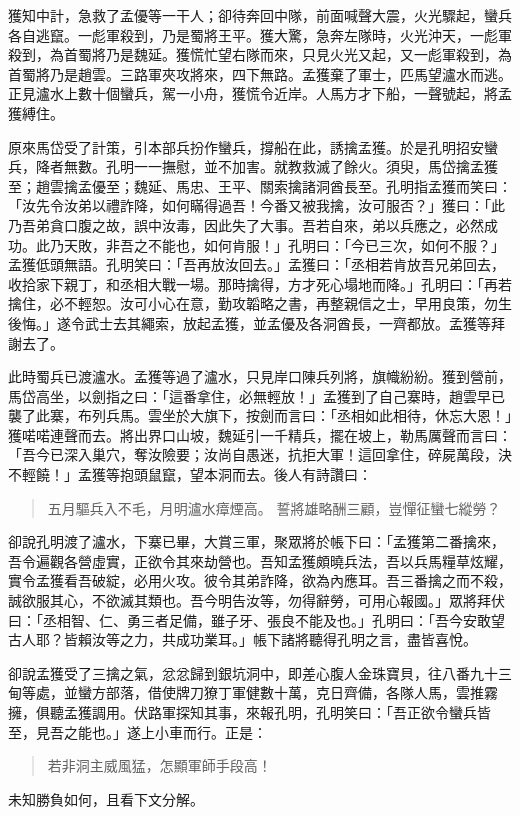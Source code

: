 獲知中計，急救了孟優等一干人；卻待奔回中隊，前面喊聲大震，火光驟起，蠻兵各自逃竄。一彪軍殺到，乃是蜀將王平。獲大驚，急奔左隊時，火光沖天，一彪軍殺到，為首蜀將乃是魏延。獲慌忙望右隊而來，只見火光又起，又一彪軍殺到，為首蜀將乃是趙雲。三路軍夾攻將來，四下無路。孟獲棄了軍士，匹馬望瀘水而逃。正見瀘水上數十個蠻兵，駕一小舟，獲慌令近岸。人馬方才下船，一聲號起，將孟獲縛住。

原來馬岱受了計策，引本部兵扮作蠻兵，撐船在此，誘擒孟獲。於是孔明招安蠻兵，降者無數。孔明一一撫慰，並不加害。就教救滅了餘火。須臾，馬岱擒孟獲至；趙雲擒孟優至；魏延、馬忠、王平、關索擒諸洞酋長至。孔明指孟獲而笑曰：「汝先令汝弟以禮詐降，如何瞞得過吾！今番又被我擒，汝可服否？」獲曰：「此乃吾弟貪口腹之故，誤中汝毒，因此失了大事。吾若自來，弟以兵應之，必然成功。此乃天敗，非吾之不能也，如何肯服！」孔明曰：「今已三次，如何不服？」孟獲低頭無語。孔明笑曰：「吾再放汝回去。」孟獲曰：「丞相若肯放吾兄弟回去，收拾家下親丁，和丞相大戰一場。那時擒得，方才死心塌地而降。」孔明曰：「再若擒住，必不輕恕。汝可小心在意，勤攻韜略之書，再整親信之士，早用良策，勿生後悔。」遂令武士去其繩索，放起孟獲，並孟優及各洞酋長，一齊都放。孟獲等拜謝去了。

此時蜀兵已渡瀘水。孟獲等過了瀘水，只見岸口陳兵列將，旗幟紛紛。獲到營前，馬岱高坐，以劍指之曰：「這番拿住，必無輕放！」孟獲到了自己寨時，趙雲早已襲了此寨，布列兵馬。雲坐於大旗下，按劍而言曰：「丞相如此相待，休忘大恩！」獲喏喏連聲而去。將出界口山坡，魏延引一千精兵，擺在坡上，勒馬厲聲而言曰：「吾今已深入巢穴，奪汝險要；汝尚自愚迷，抗拒大軍！這回拿住，碎屍萬段，決不輕饒！」孟獲等抱頭鼠竄，望本洞而去。後人有詩讚曰：

\begin{quote}
五月驅兵入不毛，月明瀘水瘴煙高。
誓將雄略酬三顧，豈憚征蠻七縱勞？
\end{quote}

卻說孔明渡了瀘水，下寨已畢，大賞三軍，聚眾將於帳下曰：「孟獲第二番擒來，吾令遍觀各營虛實，正欲令其來劫營也。吾知孟獲頗曉兵法，吾以兵馬糧草炫耀，實令孟獲看吾破綻，必用火攻。彼令其弟詐降，欲為內應耳。吾三番擒之而不殺，誠欲服其心，不欲滅其類也。吾今明告汝等，勿得辭勞，可用心報國。」眾將拜伏曰：「丞相智、仁、勇三者足備，雖子牙、張良不能及也。」孔明曰：「吾今安敢望古人耶？皆賴汝等之力，共成功業耳。」帳下諸將聽得孔明之言，盡皆喜悅。

卻說孟獲受了三擒之氣，忿忿歸到銀坑洞中，即差心腹人金珠寶貝，往八番九十三甸等處，並蠻方部落，借使牌刀獠丁軍健數十萬，克日齊備，各隊人馬，雲推霧擁，俱聽孟獲調用。伏路軍探知其事，來報孔明，孔明笑曰：「吾正欲令蠻兵皆至，見吾之能也。」遂上小車而行。正是：

\begin{quote}
若非洞主威風猛，怎顯軍師手段高！
\end{quote}

未知勝負如何，且看下文分解。
